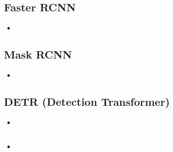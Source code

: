 \documentclass[a4, 12pt]{article}
\begin{document}
\subsection{Faster RCNN}
\begin{itemize}
    \item
\end{itemize}

\subsection{Mask RCNN}
\begin{itemize}
    \item
\end{itemize}

\subsection{DETR (Detection Transformer)}
\begin{itemize}
    \item
\end{itemize}

\subsection{}
\begin{itemize}
    \item
\end{itemize}



\end{document}
